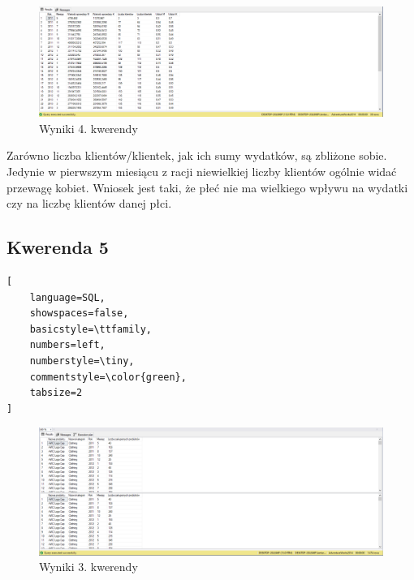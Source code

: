 \documentclass[a4paper,12pt]{article}
\begin{document}
\begin{figure}[H]
	\centering
	\includegraphics[width=1.0\textwidth]{images/4.png}
	\caption{Wyniki 4. kwerendy}
\end{figure}

Zarówno liczba klientów/klientek, jak ich sumy wydatków, są zbliżone sobie. Jedynie w pierwszym miesiącu z racji niewielkiej liczby klientów ogólnie widać przewagę kobiet. Wniosek jest taki, że płeć nie ma wielkiego wpływu na wydatki czy na liczbę klientów danej płci.

\subsection{Kwerenda 5}

{\small
	\begin{lstlisting}[
	language=SQL,
	showspaces=false,
	basicstyle=\ttfamily,
	numbers=left,
	numberstyle=\tiny,
	commentstyle=\color{green},
	tabsize=2
]
\end{lstlisting}}

\begin{figure}[H]
	\centering
	\includegraphics[width=1.0\textwidth]{images/3.png}
	\caption{Wyniki 3. kwerendy}
\end{figure}
\end{document}

